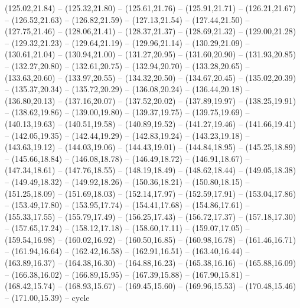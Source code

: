 {  (125.02,21.84) -- (125.32,21.80) -- (125.61,21.76) -- (125.91,21.71) -- (126.21,21.67) -- (126.52,21.63) -- (126.82,21.59) --
  (127.13,21.54) -- (127.44,21.50) -- (127.75,21.46) -- (128.06,21.41) -- (128.37,21.37) -- (128.69,21.32) -- (129.00,21.28) --
  (129.32,21.23) -- (129.64,21.19) -- (129.96,21.14) -- (130.29,21.09) -- (130.61,21.04) -- (130.94,21.00) -- (131.27,20.95) --
  (131.60,20.90) -- (131.93,20.85) -- (132.27,20.80) -- (132.61,20.75) -- (132.94,20.70) -- (133.28,20.65) -- (133.63,20.60) --
  (133.97,20.55) -- (134.32,20.50) -- (134.67,20.45) -- (135.02,20.39) -- (135.37,20.34) -- (135.72,20.29) -- (136.08,20.24) --
  (136.44,20.18) -- (136.80,20.13) -- (137.16,20.07) -- (137.52,20.02) -- (137.89,19.97) -- (138.25,19.91) -- (138.62,19.86) --
  (139.00,19.80) -- (139.37,19.75) -- (139.75,19.69) -- (140.13,19.63) -- (140.51,19.58) -- (140.89,19.52) -- (141.27,19.46) --
  (141.66,19.41) -- (142.05,19.35) -- (142.44,19.29) -- (142.83,19.24) -- (143.23,19.18) -- (143.63,19.12) -- (144.03,19.06) --
  (144.43,19.01) -- (144.84,18.95) -- (145.25,18.89) -- (145.66,18.84) -- (146.08,18.78) -- (146.49,18.72) -- (146.91,18.67) --
  (147.34,18.61) -- (147.76,18.55) -- (148.19,18.49) -- (148.62,18.44) -- (149.05,18.38) -- (149.49,18.32) -- (149.92,18.26) --
  (150.36,18.21) -- (150.80,18.15) -- (151.25,18.09) -- (151.69,18.03) -- (152.14,17.97) -- (152.59,17.91) -- (153.04,17.86) --
  (153.49,17.80) -- (153.95,17.74) -- (154.41,17.68) -- (154.86,17.61) -- (155.33,17.55) -- (155.79,17.49) -- (156.25,17.43) --
  (156.72,17.37) -- (157.18,17.30) -- (157.65,17.24) -- (158.12,17.18) -- (158.60,17.11) -- (159.07,17.05) -- (159.54,16.98) --
  (160.02,16.92) -- (160.50,16.85) -- (160.98,16.78) -- (161.46,16.71) -- (161.94,16.64) -- (162.42,16.58) -- (162.91,16.51) --
  (163.40,16.44) -- (163.89,16.37) -- (164.38,16.30) -- (164.88,16.23) -- (165.38,16.16) -- (165.88,16.09) -- (166.38,16.02) --
  (166.89,15.95) -- (167.39,15.88) -- (167.90,15.81) -- (168.42,15.74) -- (168.93,15.67) -- (169.45,15.60) -- (169.96,15.53) --
  (170.48,15.46) -- (171.00,15.39) -- cycle}
